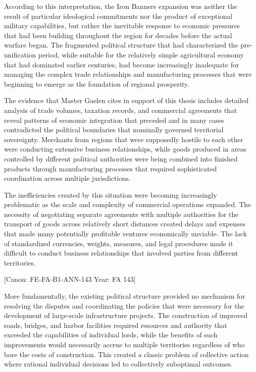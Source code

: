 According to this interpretation, the Iron Banner\textquotesingle s
expansion was neither the result of particular ideological commitments
nor the product of exceptional military capabilities, but rather the
inevitable response to economic pressures that had been building
throughout the region for decades before the actual warfare began. The
fragmented political structure that had characterized the
pre-unification period, while suitable for the relatively simple
agricultural economy that had dominated earlier centuries, had become
increasingly inadequate for managing the complex trade relationships and
manufacturing processes that were beginning to emerge as the foundation
of regional prosperity.

The evidence that Master Gaelen cites in support of this thesis includes
detailed analysis of trade volumes, taxation records, and commercial
agreements that reveal patterns of economic integration that preceded
and in many cases contradicted the political boundaries that nominally
governed territorial sovereignty. Merchants from regions that were
supposedly hostile to each other were conducting extensive business
relationships, while goods produced in areas controlled by different
political authorities were being combined into finished products through
manufacturing processes that required sophisticated coordination across
multiple jurisdictions.

The inefficiencies created by this situation were becoming increasingly
problematic as the scale and complexity of commercial operations
expanded. The necessity of negotiating separate agreements with multiple
authorities for the transport of goods across relatively short distances
created delays and expenses that made many potentially profitable
ventures economically unviable. The lack of standardized currencies,
weights, measures, and legal procedures made it difficult to conduct
business relationships that involved parties from different territories.

{[}Canon: FE-FA-B1-ANN-143 \textbar{} Year: FA 143{]}

More fundamentally, the existing political structure provided no
mechanism for resolving the disputes and coordinating the policies that
were necessary for the development of large-scale infrastructure
projects. The construction of improved roads, bridges, and harbor
facilities required resources and authority that exceeded the
capabilities of individual lords, while the benefits of such
improvements would necessarily accrue to multiple territories regardless
of who bore the costs of construction. This created a classic problem of
collective action where rational individual decisions led to
collectively suboptimal outcomes.


